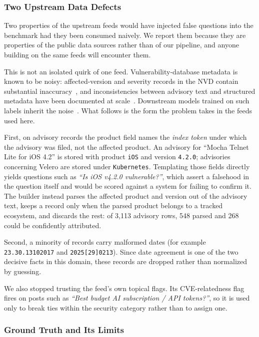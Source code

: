 \documentclass[acmsmall,anonymous,screen]{acmart}
\begin{document}
\subsubsection{Two Upstream Data Defects}

Two properties of the upstream feeds would have injected false questions into
the benchmark had they been consumed naively. We report them because they are
properties of the public data sources rather than of our pipeline, and anyone
building on the same feeds will encounter them.

This is not an isolated quirk of one feed. Vulnerability-database metadata is
known to be noisy: affected-version and severity records in the NVD contain
substantial inaccuracy~\cite{croft2023dataquality,croft2022severity,anwar2022nvd},
and inconsistencies between advisory text and structured metadata have been
documented at scale~\cite{dong2019inconsistencies}. Downstream models trained on
such labels inherit the noise~\cite{chakraborty2022vulndetection}. What follows is
the form the problem takes in the feeds used here.

First, on advisory records the product field names the \emph{index token} under
which the advisory was filed, not the affected product. An advisory for ``Mocha
Telnet Lite for iOS 4.2'' is stored with product \texttt{iOS} and version
\texttt{4.2.0}; advisories concerning Velero are stored under
\texttt{Kubernetes}. Templating those fields directly yields questions such as
\emph{``Is iOS v4.2.0 vulnerable?''}, which assert a falsehood in the question
itself and would be scored against a system for failing to confirm it. The
builder instead parses the affected product and version out of the advisory
text, keeps a record only when the parsed product belongs to a tracked
ecosystem, and discards the rest: of 3,113 advisory rows, 548 parsed and 268
could be confidently attributed.

Second, a minority of records carry malformed dates (for example
\texttt{23.30.13102017} and \texttt{2025[29]0213}). Since date agreement is one
of the two decisive facts in this domain, these records are dropped rather than
normalized by guessing.

We also stopped trusting the feed's own topical flags. Its CVE-relatedness flag
fires on posts such as \emph{``Best budget AI subscription / API tokens?''}, so
it is used only to break ties within the security category rather than to assign
one.

\subsubsection{Ground Truth and Its Limits}
\end{document}

